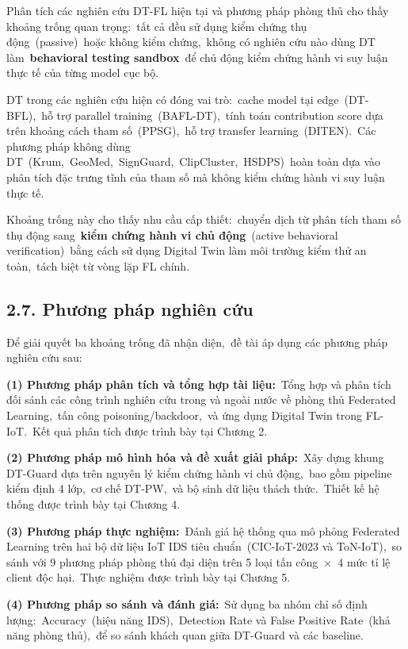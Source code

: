 Phân tích các nghiên cứu DT-FL hiện tại và phương pháp phòng thủ cho thấy khoảng trống quan trọng:~tất cả đều sử dụng kiểm chứng thụ động~(passive)~hoặc không kiểm chứng,~không có nghiên cứu nào dùng DT làm~\textbf{behavioral testing sandbox}~để chủ động kiểm chứng hành vi suy luận thực tế của từng model cục bộ.

DT trong các nghiên cứu hiện có đóng vai trò:~cache model tại edge~(DT-BFL),~hỗ trợ parallel training~(BAFL-DT),~tính toán contribution score dựa trên khoảng cách tham số~(PPSG),~hỗ trợ transfer learning~(DITEN).~Các phương pháp không dùng DT~(Krum,~GeoMed,~SignGuard,~ClipCluster,~HSDPS)~hoàn toàn dựa vào phân tích đặc trưng tĩnh của tham số mà không kiểm chứng hành vi suy luận thực tế.

Khoảng trống này cho thấy nhu cầu cấp thiết:~chuyển dịch từ phân tích tham số thụ động sang~\textbf{kiểm chứng hành vi chủ động}~(active behavioral verification)~bằng cách sử dụng Digital Twin làm môi trường kiểm thử an toàn,~tách biệt từ vòng lặp FL chính.

\subsection{2.7. Phương pháp nghiên cứu}\label{phux1b0ux1a1ng-phuxe1p-nghiuxean-cux1ee9u}

Để giải quyết ba khoảng trống đã nhận diện,~đề tài áp dụng các phương pháp nghiên cứu sau:

\textbf{(1) Phương pháp phân tích và tổng hợp tài liệu:}~Tổng hợp và phân tích đối sánh các công trình nghiên cứu trong và ngoài nước về phòng thủ Federated Learning,~tấn công poisoning/backdoor,~và ứng dụng Digital Twin trong FL-IoT.~Kết quả phân tích được trình bày tại Chương 2.

\textbf{(2) Phương pháp mô hình hóa và đề xuất giải pháp:}~Xây dựng khung DT-Guard dựa trên nguyên lý kiểm chứng hành vi chủ động,~bao gồm pipeline kiểm định 4 lớp,~cơ chế DT-PW,~và bộ sinh dữ liệu thách thức.~Thiết kế hệ thống được trình bày tại Chương 4.

\textbf{(3) Phương pháp thực nghiệm:}~Đánh giá hệ thống qua mô phỏng Federated Learning trên hai bộ dữ liệu IoT IDS tiêu chuẩn~(CIC-IoT-2023 và ToN-IoT),~so sánh với 9 phương pháp phòng thủ đại diện trên 5 loại tấn công~×~4 mức tỉ lệ client độc hại.~Thực nghiệm được trình bày tại Chương 5.

\textbf{(4) Phương pháp so sánh và đánh giá:}~Sử dụng ba nhóm chỉ số định lượng:~Accuracy~(hiệu năng IDS),~Detection Rate và False Positive Rate~(khả năng phòng thủ),~để so sánh khách quan giữa DT-Guard và các baseline.

